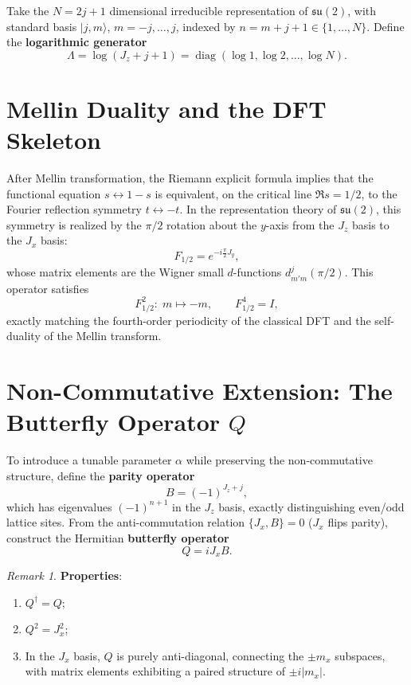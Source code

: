 \documentclass[12pt,a4paper]{amsart}
\theoremstyle{plain}
\theoremstyle{definition}
\theoremstyle{remark}
\newtheorem{remark}[theorem]{Remark}
\begin{document}
Take the $N=2j+1$ dimensional irreducible representation of $\mathfrak{su}(2)$, with standard basis $|j,m\rangle$, $m=-j,\dots,j$, indexed by $n=m+j+1\in\{1,\dots,N\}$. Define the \textbf{logarithmic generator}
\[
\Lambda=\log(J_z+j+1)=\operatorname{diag}(\log 1,\log 2,\dots,\log N).
\]

\section{Mellin Duality and the DFT Skeleton}

After Mellin transformation, the Riemann explicit formula implies that the functional equation $s\leftrightarrow 1-s$ is equivalent, on the critical line $\Re s=1/2$, to the Fourier reflection symmetry $t\leftrightarrow -t$. In the representation theory of $\mathfrak{su}(2)$, this symmetry is realized by the $\pi/2$ rotation about the $y$-axis from the $J_z$ basis to the $J_x$ basis:
\[
F_{1/2}=e^{-i\frac{\pi}{2}J_y},
\]
whose matrix elements are the Wigner small $d$-functions $d^j_{m'm}(\pi/2)$. This operator satisfies
\[
F_{1/2}^2:\;m\mapsto -m,\qquad F_{1/2}^4=I,
\]
exactly matching the fourth-order periodicity of the classical DFT and the self-duality of the Mellin transform.

\section{Non-Commutative Extension: The Butterfly Operator $Q$}

To introduce a tunable parameter $\alpha$ while preserving the non-commutative structure, define the \textbf{parity operator}
\[
B=(-1)^{J_z+j},
\]
which has eigenvalues $(-1)^{n+1}$ in the $J_z$ basis, exactly distinguishing even/odd lattice sites. From the anti-commutation relation $\{J_x,B\}=0$ ($J_x$ flips parity), construct the Hermitian \textbf{butterfly operator}
\[
Q=iJ_xB.
\]

\begin{remark}
\textbf{Properties}:
\begin{enumerate}
\item $Q^\dagger=Q$;
\item $Q^2=J_x^2$;
\item In the $J_x$ basis, $Q$ is purely anti-diagonal, connecting the $\pm m_x$ subspaces, with matrix elements exhibiting a paired structure of $\pm i|m_x|$.
\end{enumerate}
\end{remark}
\end{document}
